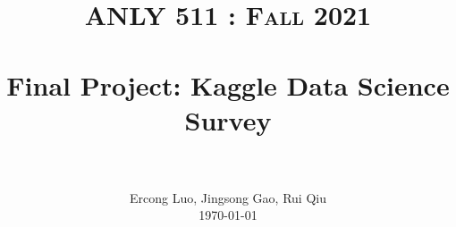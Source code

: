 \title{
	\normalfont \normalsize \textsc{ANLY 511 : Fall 2021} \\ [25pt]
	\horrule{1pt} \\[0.2cm]
	\huge Final Project: Kaggle Data Science Survey\\
	\horrule{1pt} \\[0.2cm]
}
\author{
	\normalfont 								\normalsize
	Ercong Luo, Jingsong Gao, Rui Qiu\\[-3pt] \normalsize
	\today
}
\date{\vspace{-3ex}}

\maketitle


	